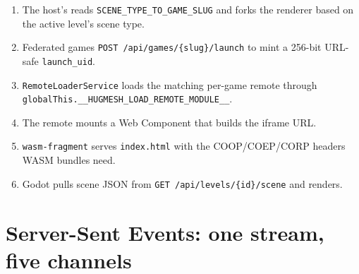 \documentclass[11pt,a4paper,openany]{book}
\begin{document}
\begin{enumerate}
  \item The host's  reads \texttt{SCENE\_TYPE\_TO\_GAME\_SLUG}
        and forks the renderer based on the active level's scene type.
  \item Federated games \texttt{POST /api/games/\{slug\}/launch} to
        mint a 256-bit URL-safe \texttt{launch\_uid}.
  \item \texttt{RemoteLoaderService} loads the matching per-game remote
        through \texttt{globalThis.\_\_HUGMESH\_LOAD\_REMOTE\_MODULE\_\_}.
  \item The remote mounts a Web Component that builds the iframe URL.
  \item \texttt{wasm-fragment} serves \texttt{index.html} with the
        COOP/COEP/CORP headers WASM bundles need.
  \item Godot pulls scene JSON from
        \texttt{GET /api/levels/\{id\}/scene} and renders.
\end{enumerate}

\chapter{Server-Sent Events: one stream, five channels}
\end{document}
